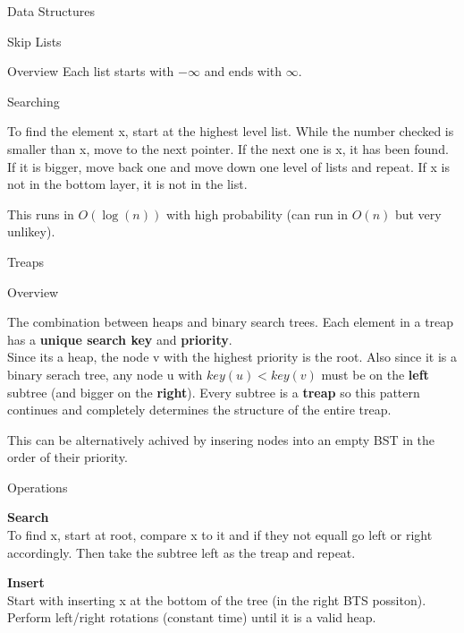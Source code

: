 \documentclass[12pt, letterpaper]{article}
\begin{document}
\begin{section}{Data Structures}
\begin{subsection}{Skip Lists}
\begin{subsubsection}{Overview}
      Each list starts with \(-\infty\) and ends with \(\infty\).

    \end{subsubsection}

    \begin{subsubsection}{Searching}

      To find the element x, start at the highest level list. While the number
      checked is smaller than x, move to the next pointer. If the next one is x,
      it has been found. If it is bigger, move back one and move down one level
      of lists and repeat. If x is not in the bottom layer, it is not in the
      list.

      This runs in \(O(\log(n))\) with high probability (can run in \(O(n)\) but
      very unlikey).

    \end{subsubsection}

  \end{subsection}

  \begin{subsection}{Treaps}

    \begin{subsubsection}{Overview}

      The combination between heaps and binary search trees. Each element in a
      treap has a \textbf{unique search key} and \textbf{priority}. \\
      Since its a heap, the node v with the highest priority is the root. Also
      since  it is a binary serach tree, any node u with \(key(u) < key(v)\)
      must be on the \textbf{left} subtree (and bigger on the \textbf{right}).
      Every subtree is a \textbf{treap} so this pattern continues and completely
      determines the structure of the entire treap.

      This can be alternatively achived by insering nodes into an empty BST in
      the order of their priority.

    \end{subsubsection}

    \begin{subsubsection}{Operations}

      \textbf{Search} \\
      To find x, start at root, compare x to it and if they not equall go left
      or right accordingly. Then take the subtree left as the treap and repeat.

      \textbf{Insert} \\
      Start with inserting  x at the bottom of the tree (in the right BTS
      possiton). Perform left/right rotations (constant time) until it is a
      valid heap.


\end{subsubsection}
\end{subsection}
\end{section}
\end{document}
